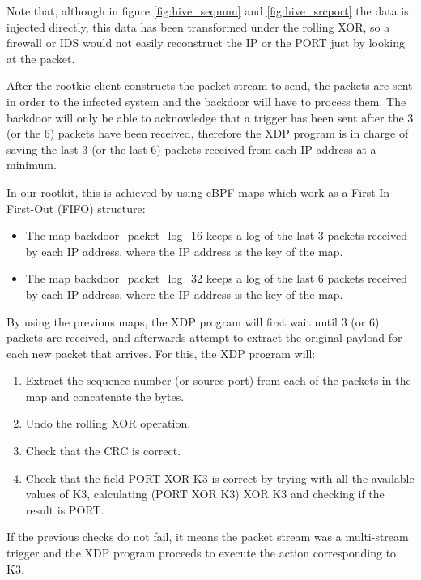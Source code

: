 Note that, although in figure \ref{fig:hive_seqnum} and \ref{fig:hive_srcport} the data is injected directly, this data has been transformed under the rolling XOR, so a firewall or IDS would not easily reconstruct the IP or the PORT just by looking at the packet.

After the rootkic client constructs the packet stream to send, the packets are sent in order to the infected system and the backdoor will have to process them. The backdoor will only be able to acknowledge that a trigger has been sent after the 3 (or the 6) packets have been received, therefore the XDP program is in charge of saving the last 3 (or the last 6) packets received from each IP address at a minimum.

In our rootkit, this is achieved by using eBPF maps which work as a First-In-First-Out (FIFO) structure:
\begin{itemize}
\item The map backdoor\_packet\_log\_16 keeps a log of the last 3 packets received by each IP address, where the IP address is the key of the map.
\item The map backdoor\_packet\_log\_32 keeps a log of the last 6 packets received by each IP address, where the IP address is the key of the map.
\end{itemize}

By using the previous maps, the XDP program will first wait until 3 (or 6) packets are received, and afterwards attempt to extract the original payload for each new packet that arrives. For this, the XDP program will:
\begin{enumerate}
\item Extract the sequence number (or source port) from each of the packets in the map and concatenate the bytes.
\item Undo the rolling XOR operation.
\item Check that the CRC is correct.
\item Check that the field PORT XOR K3 is correct by trying with all the available values of K3, calculating (PORT XOR K3) XOR K3 and checking if the result is PORT.
\end{enumerate}

If the previous checks do not fail, it means the packet stream was a multi-stream trigger and the XDP program proceeds to execute the action corresponding to K3.



